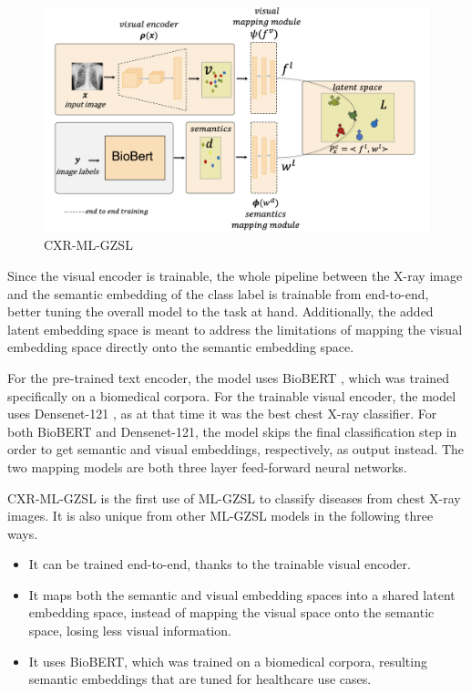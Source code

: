 \documentclass[letterpaper]{article} %
\begin{document}
\begin{figure}[h!]
\centering
\includegraphics[width=0.9\columnwidth]{model.png}
\caption{CXR-ML-GZSL \cite{hayat2021multilabel}}
\label{fig:model}
\end{figure}

Since the visual encoder is trainable, the whole pipeline between the X-ray image and the semantic embedding of the class label is trainable from end-to-end, better tuning the overall model to the task at hand. Additionally, the added latent embedding space is meant to address the limitations of mapping the visual embedding space directly onto the semantic embedding space.

For the pre-trained text encoder, the model uses BioBERT \cite{10.1093/bioinformatics/btz682}, which was trained specifically on a biomedical corpora. For the trainable visual encoder, the model uses Densenet-121 \cite{rajpurkar2017chexnetradiologistlevelpneumoniadetection}, as at that time it was the best chest X-ray classifier. For both BioBERT and Densenet-121, the model skips the final classification step in order to get semantic and visual embeddings, respectively, as output instead. The two mapping models are both three layer feed-forward neural networks.

CXR-ML-GZSL is the first use of ML-GZSL to classify diseases from chest X-ray images. It is also unique from other ML-GZSL models in the following three ways.

\begin{itemize}
    \item It can be trained end-to-end, thanks to the trainable visual encoder.
    \item It maps both the semantic and visual embedding spaces into a shared latent embedding space, instead of mapping the visual space onto the semantic space, losing less visual information.
    \item It uses BioBERT, which was trained on a biomedical corpora, resulting semantic embeddings that are tuned for healthcare use cases.
\end{itemize}
\end{document}
